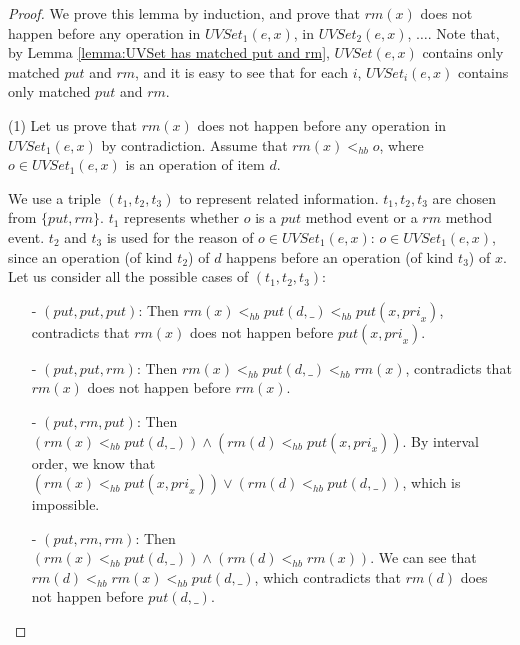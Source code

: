 \begin {proof}

We prove this lemma by induction, and prove that $\textit{rm}(x)$ does not happen before any operation in $\textit{UVSet}_1(e,x)$, in $\textit{UVSet}_2(e,x)$, $\ldots$. Note that, by Lemma \ref{lemma:UVSet has matched put and rm}, $\textit{UVSet}(e,x)$ contains only matched $\textit{put}$ and $\textit{rm}$, and it is easy to see that for each $i$, $\textit{UVSet}_i(e,x)$ contains only matched $\textit{put}$ and $\textit{rm}$.

\noindent (1) Let us prove that $\textit{rm}(x)$ does not happen before any operation in $\textit{UVSet}_1(e,x)$ by contradiction. Assume that $\textit{rm}(x) <_{hb} o$, where $o \in \textit{UVSet}_1(e,x)$ is an operation of item $d$. %

We use a triple $(t_1,t_2,t_3)$ to represent related information. $t_1,t_2,t_3$ are chosen from $\{ \textit{put},\textit{rm} \}$. $t_1$ represents whether $o$ is a $\textit{put}$ method event or a $\textit{rm}$ method event. $t_2$ and $t_3$ is used for the reason of $o \in \textit{UVSet}_1(e,x)$: $o \in \textit{UVSet}_1(e,x)$, since an operation (of kind $t_2$) of $d$ happens before an operation (of kind $t_3$) of $x$. Let us consider all the possible cases of $(t_1,t_2,t_3)$:

\begin{itemize}
\setlength{\itemsep}{0.5pt}
\item[-] $(\textit{put},\textit{put},\textit{put})$: Then $\textit{rm}(x) <_{hb} \textit{put}(d,\_) <_{hb} \textit{put}(x,\textit{pri}_x)$, contradicts that $\textit{rm}(x)$ does not happen before $\textit{put}(x,\textit{pri}_x)$.

\item[-] $(\textit{put},\textit{put},\textit{rm})$: Then $\textit{rm}(x) <_{hb} \textit{put}(d,\_) <_{hb} \textit{rm}(x)$, contradicts that $\textit{rm}(x)$ does not happen before $\textit{rm}(x)$.

\item[-] $(\textit{put},\textit{rm},\textit{put})$: Then $( \textit{rm}(x) <_{hb} \textit{put}(d,\_) ) \wedge ( \textit{rm}(d) <_{hb} \textit{put}(x,\textit{pri}_x) )$. By interval order, we know that $( \textit{rm}(x) <_{hb} \textit{put}(x,\textit{pri}_x) ) \vee ( \textit{rm}(d) <_{hb} \textit{put}(d,\_) )$, which is impossible.

\item[-] $(\textit{put},\textit{rm},\textit{rm})$: Then $( \textit{rm}(x) <_{hb} \textit{put}(d,\_) ) \wedge ( \textit{rm}(d) <_{hb} \textit{rm}(x) )$. We can see that $\textit{rm}(d) <_{hb} \textit{rm}(x) <_{hb} \textit{put}(d,\_)$, which contradicts that $\textit{rm}(d)$ does not happen before $\textit{put}(d,\_)$.


\end{itemize}
\end{proof}
